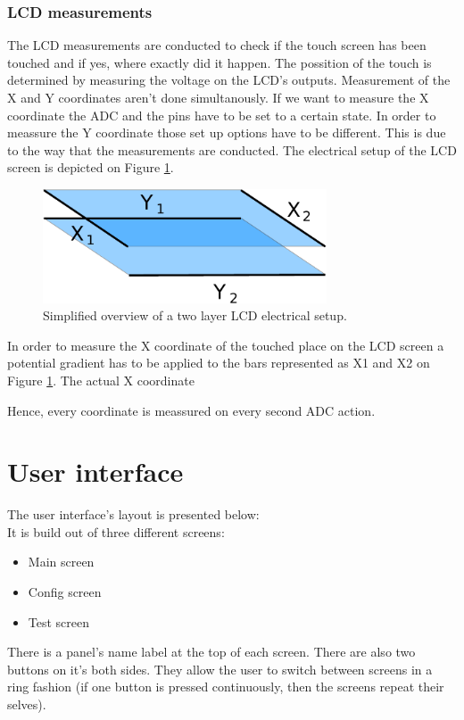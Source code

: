 \subsubsection{LCD measurements}
The LCD measurements are conducted to check if the touch screen has been touched and if yes, where exactly did it happen. The possition of the touch is determined by measuring the voltage on the LCD's outputs. Measurement of the X and Y coordinates aren't done simultanously. If we want to measure the X coordinate the ADC and the pins have to be set to a certain state. In order to meassure the Y coordinate those set up options have to be different. This is due to the way that the measurements are conducted. The electrical setup of the LCD screen is depicted on Figure \ref{fig:LCD_screen_measurement}.

\begin{figure}
  \centering
  \includegraphics[width=0.75\textwidth]{img/used/adc_layers.pdf}               
  \caption{Simplified overview of a two layer LCD electrical setup.}
  \label{fig:LCD_screen_measurement}
\end{figure}

In order to measure the X coordinate of the touched place on the LCD screen a potential gradient has to be applied to the bars represented as X1 and X2 on Figure \ref{fig:LCD_screen_measurement}. The actual X coordinate

Hence, every coordinate is meassured on every second ADC action.

 
\section{User interface}
The user interface's layout is presented below:\\
It is build out of three different screens:
\begin{itemize}
\item Main screen
\item Config screen
\item Test screen
\end{itemize}
There is a panel's name label at the top of each screen. There are also two buttons on it's both sides. They allow the user to switch between screens in a ring fashion (if one button is pressed continuously, then the screens repeat their selves).\\


